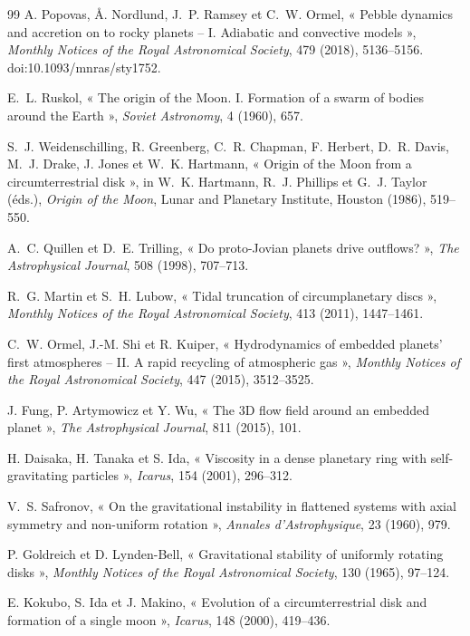 \documentclass[11pt,a4paper,openany]{report}
\begin{document}
\begin{thebibliography}{99}
 A. Popovas, Å. Nordlund, J.~P. Ramsey et C.~W. Ormel, « Pebble dynamics and
accretion on to rocky planets -- I. Adiabatic and convective models », \emph{Monthly Notices of the
Royal Astronomical Society}, 479 (2018), 5136--5156. doi:10.1093/mnras/sty1752.

 E.~L. Ruskol, « The origin of the Moon. I. Formation of a swarm of bodies
around the Earth », \emph{Soviet Astronomy}, 4 (1960), 657.

 S.~J. Weidenschilling, R. Greenberg, C.~R. Chapman, F. Herbert,
D.~R. Davis, M.~J. Drake, J. Jones et W.~K. Hartmann, « Origin of the Moon from a circumterrestrial
disk », in W.~K. Hartmann, R.~J. Phillips et G.~J. Taylor (éds.), \emph{Origin of the Moon}, Lunar
and Planetary Institute, Houston (1986), 519--550.

 A.~C. Quillen et D.~E. Trilling, « Do proto-Jovian planets drive
outflows? », \emph{The Astrophysical Journal}, 508 (1998), 707--713.

 R.~G. Martin et S.~H. Lubow, « Tidal truncation of circumplanetary
discs », \emph{Monthly Notices of the Royal Astronomical Society}, 413 (2011), 1447--1461.

 C.~W. Ormel, J.-M. Shi et R. Kuiper, « Hydrodynamics of embedded planets' first
atmospheres -- II. A rapid recycling of atmospheric gas », \emph{Monthly Notices of the Royal
Astronomical Society}, 447 (2015), 3512--3525.

 J. Fung, P. Artymowicz et Y. Wu, « The 3D flow field around an embedded
planet », \emph{The Astrophysical Journal}, 811 (2015), 101.

 H. Daisaka, H. Tanaka et S. Ida, « Viscosity in a dense planetary ring with
self-gravitating particles », \emph{Icarus}, 154 (2001), 296--312.

 V.~S. Safronov, « On the gravitational instability in flattened systems with
axial symmetry and non-uniform rotation », \emph{Annales d'Astrophysique}, 23 (1960), 979.

 P. Goldreich et D. Lynden-Bell, « Gravitational stability of
uniformly rotating disks », \emph{Monthly Notices of the Royal Astronomical Society}, 130 (1965),
97--124.

 E. Kokubo, S. Ida et J. Makino, « Evolution of a circumterrestrial disk and
formation of a single moon », \emph{Icarus}, 148 (2000), 419--436.


\end{thebibliography}
\end{document}
